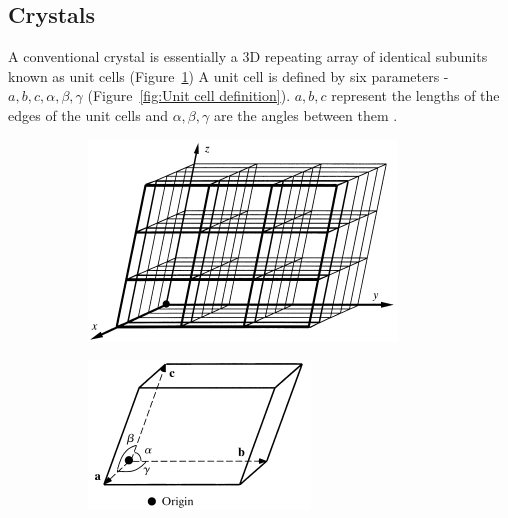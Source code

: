     \subsection{Crystals}
    \label{sub:Crystals}
        A conventional crystal is essentially a 3D repeating array of identical subunits known as unit cells (Figure~\ref{fig:Unit cells as building blocks})
        A unit cell is defined by six parameters - $a, b, c, \alpha, \beta, \gamma$ (Figure~\ref{fig:Unit cell definition}).
        $a, b, c$ represent the lengths of the edges of the unit cells and $\alpha, \beta, \gamma$ are the angles between them \cite{drenth2012}.
        \begin{figure}[H]
            \centering
            \begin{subfigure}[b]{0.45\textwidth}
                    \centering
                    \includegraphics[width=\textwidth]{figures/introduction/unitcellsbuildingblocks.png}
                    \caption{}
                    \label{fig:Unit cells as building blocks}
            \end{subfigure}
            \qquad
            \begin{subfigure}[b]{0.4\textwidth}
                    \centering
                    \includegraphics[width=\textwidth]{figures/introduction/unitcelldefinition.png}

\end{subfigure}
\end{figure}
